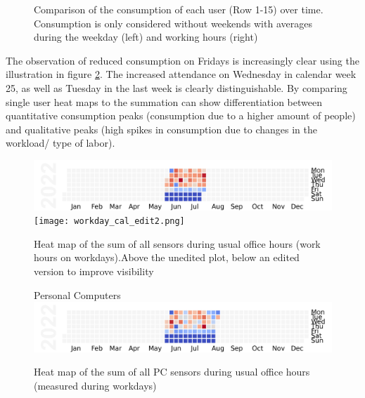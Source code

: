 \begin{figure}[ht]
    \newline
    \newline
    \caption{\centering Comparison of the consumption of each user (Row 1-15) over time. Consumption is only considered without weekends with averages during the weekday (left) and working hours (right)}
    \label{fig:user_comparison}
\end{figure}
The observation of reduced consumption on Fridays is increasingly clear using the illustration in figure \ref{fig:office_consumption}. The increased attendance on Wednesday in calendar week 25, as well as Tuesday in the last week is clearly distinguishable. By comparing single user heat maps to the summation can show differentiation between quantitative consumption peaks (consumption due to a higher amount of people) and qualitative peaks (high spikes in consumption due to changes in the workload/ type of labor).\\
\begin{figure}[ht]
	\centering
	\includegraphics[width=\textwidth]{images/heatmaps/workday_cal.png}
	\texttt{[image: workday\_cal\_edit2.png]}
	\caption{Heat map of the sum of all sensors during usual office hours (work hours on \glspl{workday}).Above the unedited plot, below an edited version to improve visibility}
	\label{fig:office_consumption}
\end{figure}
\begin{figure}[ht]
	\centering
	Personal Computers
	\includegraphics[width=\textwidth]{images/heatmaps/devicetype_PC_workday_cal.png}
	\caption{Heat map of the sum of all PC sensors during usual office hours (measured during \glspl{workday})}
	\label{fig:pc_hm}
\end{figure}
